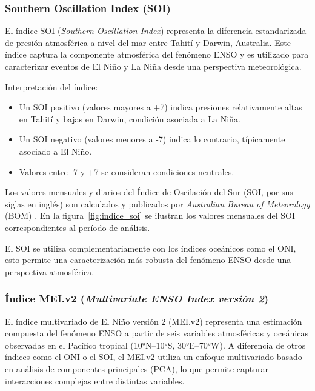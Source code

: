 \subsubsection{Southern Oscillation Index (SOI)}

El índice SOI (\textit{Southern Oscillation Index}) representa la diferencia estandarizada de presión atmosférica a nivel del mar entre Tahití y Darwin, Australia. Este índice captura la componente atmosférica del fenómeno ENSO y es utilizado para caracterizar eventos de El Niño y La Niña desde una perspectiva meteorológica.

Interpretación del índice:

\begin{itemize}
    \item Un SOI positivo (valores mayores a +7) indica presiones relativamente altas en Tahití y bajas en Darwin, condición asociada a La Niña.
    \item Un SOI negativo (valores menores a -7) indica lo contrario, típicamente asociado a El Niño.
    \item Valores entre -7 y +7 se consideran condiciones neutrales.
\end{itemize}

Los valores mensuales y diarios del Índice de Oscilación del Sur (SOI, por sus siglas en inglés) son calculados y publicados por \textit{Australian Bureau of Meteorology}  (BOM) \cite{bom_soi_2024}. En la figura~\ref{fig:indice_soi} se ilustran los valores mensuales del SOI correspondientes al período de análisis.


El SOI se utiliza complementariamente con los índices oceánicos como el ONI, esto permite una caracterización más robusta del fenómeno ENSO desde una perspectiva atmosférica.


\subsubsection{Índice MEI.v2 (\textit{Multivariate ENSO Index versión 2})}

El índice multivariado de El Niño versión 2 (MEI.v2) representa una estimación compuesta del fenómeno ENSO a partir de seis variables atmosféricas y oceánicas observadas en el Pacífico tropical (10°N–10°S, 30°E–70°W). A diferencia de otros índices como el ONI o el SOI, el MEI.v2 utiliza un enfoque multivariado basado en análisis de componentes principales (PCA), lo que permite capturar interacciones complejas entre distintas variables.

